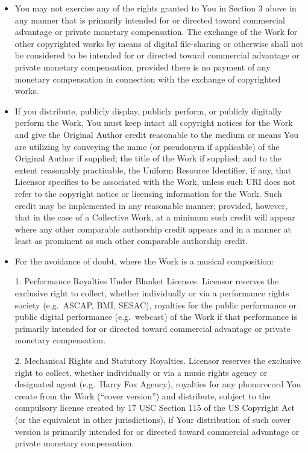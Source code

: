 \begin{itemize}
\begin{itemize}
\item You may not exercise any of the rights granted to You in Section
3 above in any manner that is primarily intended for or directed
toward commercial advantage or private monetary compensation.  The
exchange of the Work for other copyrighted works by means of digital
file-sharing or otherwise shall not be considered to be intended for
or directed toward commercial advantage or private monetary
compensation, provided there is no payment of any monetary
compensation in connection with the exchange of copyrighted works.

\item If you distribute, publicly display, publicly perform, or
publicly digitally perform the Work, You must keep intact all
copyright notices for the Work and give the Original Author credit
reasonable to the medium or means You are utilizing by conveying the
name (or pseudonym if applicable) of the Original Author if supplied;
the title of the Work if supplied; and to the extent reasonably
practicable, the Uniform Resource Identifier, if any, that Licensor
specifies to be associated with the Work, unless such URI does not
refer to the copyright notice or licensing information for the Work. 
Such credit may be implemented in any reasonable manner; provided,
however, that in the case of a Collective Work, at a minimum such
credit will appear where any other comparable authorship credit
appears and in a manner at least as prominent as such other comparable
authorship credit.

\item

For the avoidance of doubt, where the Work is a musical composition:

1.  Performance Royalties Under Blanket Licenses.  Licensor reserves
the exclusive right to collect, whether individually or via a
performance rights society (e.g.\  ASCAP, BMI, SESAC), royalties for
the public performance or public digital performance (e.g.\  webcast)
of the Work if that performance is primarily intended for or directed
toward commercial advantage or private monetary compensation.

2.  Mechanical Rights and Statutory Royalties.  Licensor reserves the
exclusive right to collect, whether individually or via a music rights
agency or designated agent (e.g.\  Harry Fox Agency), royalties for any
phonorecord You create from the Work (``cover version'') and
distribute, subject to the compulsory license created by 17 USC
Section 115 of the US Copyright Act (or the equivalent in other
jurisdictions), if Your distribution of such cover version is
primarily intended for or directed toward commercial advantage or
private monetary compensation.


\end{itemize}
\end{itemize}
